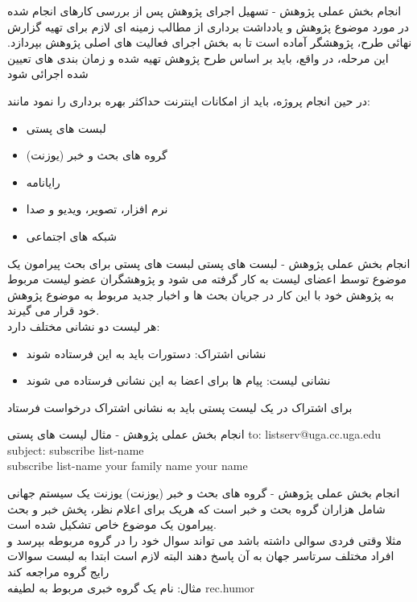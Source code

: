 \documentclass[14pt]{beamer}
\makeatletter
\newcommand{\rtlist}{\raggedleft\rightskip\@totalleftmargin}
\newcommand{\framefontsizelarge}{\fontsize{18pt}{0pt}\selectfont}
\newcommand{\frametitlefontsize}{\fontsize{20pt}{0pt}\selectfont}
\newcommand{\defaultvspace}{\vspace{5mm}}
\makeatother
\begin{document}
\begin{persian}
	\begin{frame}{\frametitlefontsize  انجام بخش عملی پژوهش - تسهیل اجرای پژوهش }
		\framefontsizelarge
		پس از بررسی کارهای انجام شده در مورد موضوع پژوهش و یادداشت برداری از مطالب زمینه ای لازم برای تهیه گزارش نهائی طرح، پژوهشگر آماده است تا به بخش اجرای فعالیت های اصلی پژوهش بپردازد. این مرحله، در واقع، باید بر اساس طرح پژوهش تهیه شده و زمان بندی های تعیین شده اجرائی شود
		
		در حین انجام پروژه، باید از امکانات اینترنت حداکثر بهره برداری را نمود مانند:
		\begin{itemize}\rtlist
			\item لبست های پستی
			\item گروه های بحث و خبر (یوزنت)
			\item رایانامه
			\item نرم افزار، تصویر، ویدیو و صدا
			\item شبکه های اجتماعی
		\end{itemize}
	\end{frame}
	
	\begin{frame}{\frametitlefontsize  انجام بخش عملی پژوهش - لبست های پستی }
		\framefontsizelarge
		لبست های پستی برای بحث پیرامون یک موضوع توسط اعضای لیست به کار گرفته می شود و پژوهشگران عضو لیست مربوط به پژوهش خود با این کار در جریان بحث ها و اخبار جدید مربوط به موضوع پژوهش خود قرار می گیرند.\defaultvspace\\
		هر لیست دو نشانی مختلف دارد: 
		\begin{itemize}\rtlist
			\item نشانی اشتراک: دستورات باید به این فرستاده شوند
			\item نشانی لیست: پیام ها برای اعضا به این نشانی فرستاده می شوند
		\end{itemize}
		\persian
		برای اشتراک در یک لیست پستی باید به نشانی اشتراک درخواست فرستاد
	\end{frame}
	
	\begin{frame}{\frametitlefontsize  انجام بخش عملی پژوهش - مثال لیست های پستی }
		\framefontsizelarge
		\latin
		to: listserv@uga.cc.uga.edu\\
		subject: subscribe list-name\\
		subscribe list-name your family name your name\\
	\end{frame}
	
	\begin{frame}{\frametitlefontsize  انجام بخش عملی پژوهش - گروه های بحث و خبر (یوزنت) }
		\framefontsizelarge
		یوزنت یک سیستم جهانی شامل هزاران گروه بحث و خبر است که هریک برای اعلام نظر، پخش خبر و بحث پیرامون یک موضوع خاص تشکیل شده است. \defaultvspace\\
		مثلا وقتی فردی سوالی داشته باشد می تواند سوال خود را در گروه مربوطه بپرسد و افراد مختلف سرتاسر جهان به آن پاسخ دهند البته لازم است ابتدا به لبست سوالات رایج گروه مراجعه کند\\
		مثال: نام یک گروه خبری مربوط به لطیفه rec.humor
	\end{frame}


\end{persian}
\end{document}
